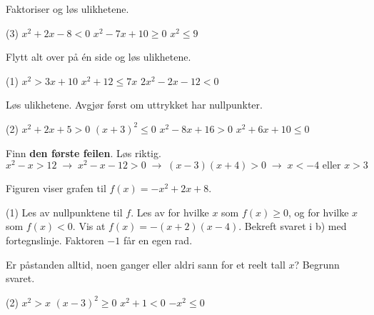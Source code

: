 Faktoriser og løs ulikhetene.
\begin{tasks}(3)
  \task $x^2 + 2x - 8 < 0$
  \task $x^2 - 7x + 10 \ge 0$
  \task $x^2 \le 9$
\end{tasks}


Flytt alt over på én side og løs ulikhetene.
\begin{tasks}(1)
  \task $x^2 > 3x + 10$
  \task $x^2 + 12 \le 7x$
  \task $2x^2 - 2x - 12 < 0$
\end{tasks}

Løs ulikhetene. Avgjør først om uttrykket har nullpunkter.
\begin{tasks}(2)
  \task $x^2 + 2x + 5 > 0$
  \task $(x + 3)^2 \le 0$
  \task $x^2 - 8x + 16 > 0$
  \task $x^2 + 6x + 10 \le 0$
\end{tasks}

Finn \textbf{den første feilen}. Løs riktig.
\[ x^2 - x > 12 \;\longrightarrow\; x^2 - x - 12 > 0 \;\longrightarrow\; (x - 3)(x + 4) > 0 \;\longrightarrow\; x < -4 \text{ eller } x > 3 \]

Figuren viser grafen til $f(x) = -x^2 + 2x + 8$.

\begin{center}
\end{center}
\begin{tasks}(1)
  \task Les av nullpunktene til $f$.
  \task Les av for hvilke $x$ som $f(x) \ge 0$, og for hvilke $x$ som $f(x) < 0$.
  \task Vis at $f(x) = -(x+2)(x-4)$. Bekreft svaret i b) med fortegnslinje. Faktoren $-1$ får en egen rad.
\end{tasks}


Er påstanden alltid, noen ganger eller aldri sann for et reelt tall $x$? Begrunn svaret.
\begin{tasks}(2)
  \task $x^2 > x$
  \task $(x - 3)^2 \ge 0$
  \task $x^2 + 1 < 0$
  \task $-x^2 \le 0$
\end{tasks}


